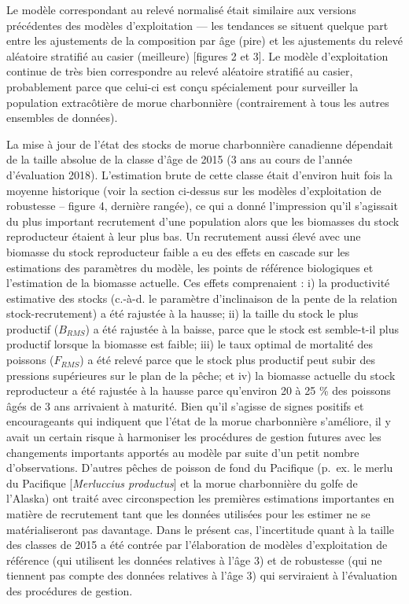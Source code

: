 \documentclass[11pt]{book}
\begin{document}
Le modèle correspondant au relevé normalisé était similaire aux versions précédentes des modèles d'exploitation --- les tendances se situent quelque part entre les ajustements de la composition par âge (pire) et les ajustements du relevé aléatoire stratifié au casier (meilleure) {[}figures 2 et 3{]}. Le modèle d'exploitation continue de très bien correspondre au relevé aléatoire stratifié au casier, probablement parce que celui-ci est conçu spécialement pour surveiller la population extracôtière de morue charbonnière (contrairement à tous les autres ensembles de données).

La mise à jour de l'état des stocks de morue charbonnière canadienne dépendait de la taille absolue de la classe d'âge de 2015 (3 ans au cours de l'année d'évaluation 2018). L'estimation brute de cette classe était d'environ huit fois la moyenne historique (voir la section ci-dessus sur les modèles d'exploitation de robustesse -- figure 4, dernière rangée), ce qui a donné l'impression qu'il s'agissait du plus important recrutement d'une population alors que les biomasses du stock reproducteur étaient à leur plus bas. Un recrutement aussi élevé avec une biomasse du stock reproducteur faible a eu des effets en cascade sur les estimations des paramètres du modèle, les points de référence biologiques et l'estimation de la biomasse actuelle. Ces effets comprenaient : i) la productivité estimative des stocks (c.-à-d. le paramètre d'inclinaison de la pente de la relation stock-recrutement) a été rajustée à la hausse; ii) la taille du stock le plus productif (\(B_{RMS}\)) a été rajustée à la baisse, parce que le stock est semble-t-il plus productif lorsque la biomasse est faible; iii) le taux optimal de mortalité des poissons (\(F_{RMS}\)) a été relevé parce que le stock plus productif peut subir des pressions supérieures sur le plan de la pêche; et iv) la biomasse actuelle du stock reproducteur a été rajustée à la hausse parce qu'environ 20 à 25 \% des poissons âgés de 3 ans arrivaient à maturité. Bien qu'il s'agisse de signes positifs et encourageants qui indiquent que l'état de la morue charbonnière s'améliore, il y avait un certain risque à harmoniser les procédures de gestion futures avec les changements importants apportés au modèle par suite d'un petit nombre d'observations. D'autres pêches de poisson de fond du Pacifique (p.~ex. le merlu du Pacifique {[}\emph{Merluccius productus}{]} et la morue charbonnière du golfe de l'Alaska) ont traité avec circonspection les premières estimations importantes en matière de recrutement tant que les données utilisées pour les estimer ne se matérialiseront pas davantage. Dans le présent cas, l'incertitude quant à la taille des classes de 2015 a été contrée par l'élaboration de modèles d'exploitation de référence (qui utilisent les données relatives à l'âge 3) et de robustesse (qui ne tiennent pas compte des données relatives à l'âge 3) qui serviraient à l'évaluation des procédures de gestion.
\end{document}

